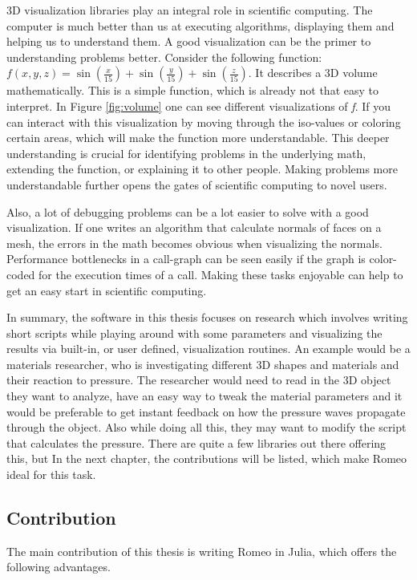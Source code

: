 3D visualization libraries play an integral role in scientific computing.
The computer is much better than us at executing algorithms, displaying them and helping us to understand them.
A good visualization can be the primer to understanding problems better.
Consider the following function: $f(x,y,z)=\sin(\frac{x}{15})+\sin(\frac{y}{15})+\sin(\frac{z}{15})$. 
It describes a 3D volume mathematically. 
This is a simple function, which is already not that easy to interpret. In Figure \ref{fig:volume} one can see different visualizations of \textit{f}.
If you can interact with this visualization by moving through the iso-values or coloring certain areas, which will make the function more understandable.
This deeper understanding is crucial for identifying problems in the underlying math, extending the function, or explaining it to other people. 
Making problems more understandable further opens the gates of scientific computing to novel users.

Also, a lot of debugging problems can be a lot easier to solve with a good visualization. 
If one writes an algorithm that calculate normals of faces on a mesh, the errors in the math becomes obvious when visualizing the normals.
Performance bottlenecks in a call-graph can be seen easily if the graph is color-coded for the execution times of a call. 
Making these tasks enjoyable can help to get an easy start in scientific computing.

In summary, the software in this thesis focuses on research which involves writing short scripts while playing around with some parameters and visualizing the results via built-in, or user defined, visualization routines.
An example would be a materials researcher, who is investigating different 3D shapes and materials and their reaction to pressure.
The researcher would need to read in the 3D object they want to analyze, have an easy way to tweak the material parameters and it would be preferable to get instant feedback on how the pressure waves propagate through the object. Also while doing all this, they may want to modify the script that calculates the pressure.
There are quite a few libraries out there offering this, but In the next chapter, the contributions will be listed, which make Romeo ideal for this task.


\subsection{Contribution}

The main contribution of this thesis is writing Romeo in Julia, which offers the following advantages.

